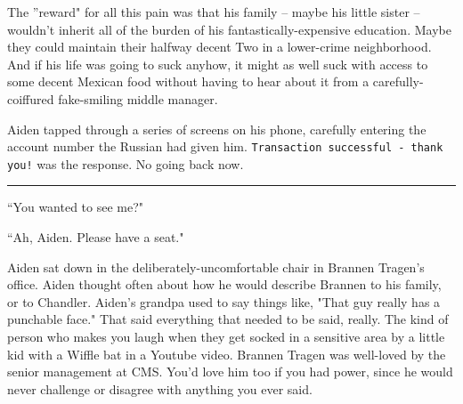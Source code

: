\documentclass[11pt]{book}
\begin{document}
	The ''reward" for all this pain was that his family -- maybe his little sister -- wouldn't inherit all of the burden of his fantastically-expensive education. Maybe they could maintain their halfway decent Two in a lower-crime neighborhood. And if his life was going to suck anyhow, it might as well suck with access to some decent Mexican food without having to hear about it from a carefully-coiffured fake-smiling middle manager.
	
	Aiden tapped through a series of screens on his phone, carefully entering the account number the Russian had given him. \texttt{Transaction successful - thank you!} was the response. No going back now.
	
	\vspace{0.5cm}
	\hrule
	\vspace{0.5cm}
	
	``You wanted to see me?"
	
	``Ah, Aiden. Please have a seat."
	
	Aiden sat down in the deliberately-uncomfortable chair in Brannen Tragen’s office. Aiden thought often about how he would describe Brannen to his family, or to Chandler. Aiden's grandpa used to say things like, "That guy really has a punchable face." That said everything that needed to be said, really. The kind of person who makes you laugh when they get socked in a sensitive area by a little kid with a Wiffle bat in a Youtube video. Brannen Tragen was well-loved by the senior management at CMS. You'd love him too if you had power, since he would never challenge or disagree with anything you ever said.
	
\end{document}
